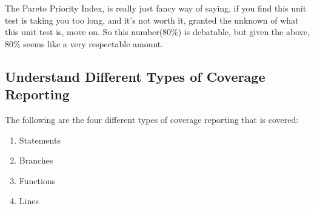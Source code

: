 The Pareto Priority Index, is really just fancy way of saying, if you find this
unit test is taking you too long, and it's not worth it, granted the unknown
of what this unit test is, move on. So this number(80\%) is debatable, but given
the above, 80\% seems like a very respectable amount.

\subsection{ Understand Different Types of Coverage Reporting }
The following are the four different types of coverage reporting that is
covered:
\begin{enumerate}
  \item Statements
  \item Branches
  \item Functions
  \item Lines
\end{enumerate}
